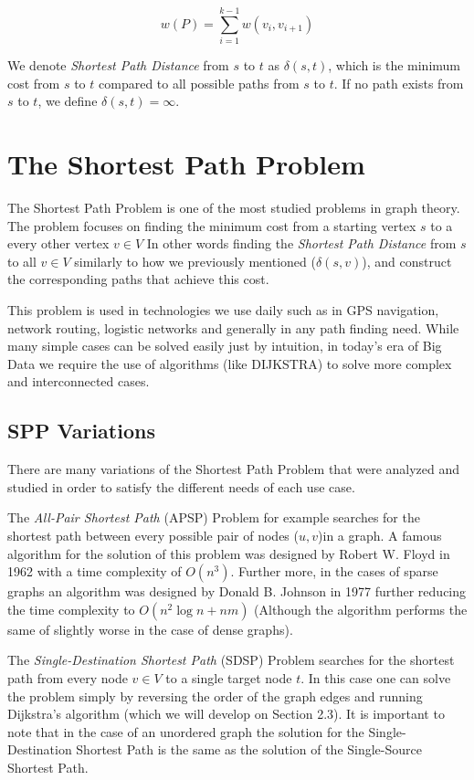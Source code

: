 \begin{equation}
    w(P) = \sum_{i=1}^{k-1} w(v_i, v_{i+1})
\end{equation}

We denote \textit{Shortest Path Distance} from $s$ to $t$ as $\delta(s, t)$, which is the minimum cost from $s$ to $t$ compared to all possible paths from $s$ to $t$. 
If no path exists from $s$ to $t$, we define $\delta(s, t) = \infty$.

\section{The Shortest Path Problem}
The Shortest Path Problem is one of the most studied problems in graph theory.
The problem focuses on finding the minimum cost from a starting vertex $s$ to a every other vertex $v \in V$
In other words finding the \textit{Shortest Path Distance} from $s$ to all $v \in V$ similarly to how we previously mentioned ($\delta(s,v)$), and construct the corresponding paths that achieve this cost.

This problem is used in technologies we use daily such as in GPS navigation, network routing, logistic networks and generally in any path finding need.
While many simple cases can be solved easily just by intuition, in today's era of Big Data we require the use of algorithms (like \textsc{DIJKSTRA}) to solve more complex and interconnected cases.

\subsection{SPP Variations}
There are many variations of the Shortest Path Problem that were analyzed and studied in order to satisfy the different needs of each use case.

The \textit{All-Pair Shortest Path} (APSP) Problem for example searches for the shortest path between every possible pair of nodes ($u , v$)in a graph.
A famous algorithm for the solution of this problem was designed by Robert W. Floyd\cite{floydAlgorithm97Shortest1962} in 1962 with a time complexity of $O(n^3)$.
Further more, in the cases of sparse graphs an algorithm was designed by Donald B. Johnson\cite{johnsonEfficientAlgorithmsShortest} in 1977 further reducing the time complexity to $O(n^2\log n+nm)$
(Although the algorithm performs the same of slightly worse in the case of dense graphs).

The \textit{Single-Destination Shortest Path} (SDSP) Problem searches for the shortest path from every node $v \in V$ to a single target node $t$. 
In this case one can solve the problem simply by reversing the order of the graph edges and running Dijkstra's algorithm\cite{dijkstraNoteTwoProblems1959} (which we will develop on Section 2.3).
It is important to note that in the case of an unordered graph the solution for the Single-Destination Shortest Path is the same as the solution of the Single-Source Shortest Path.

